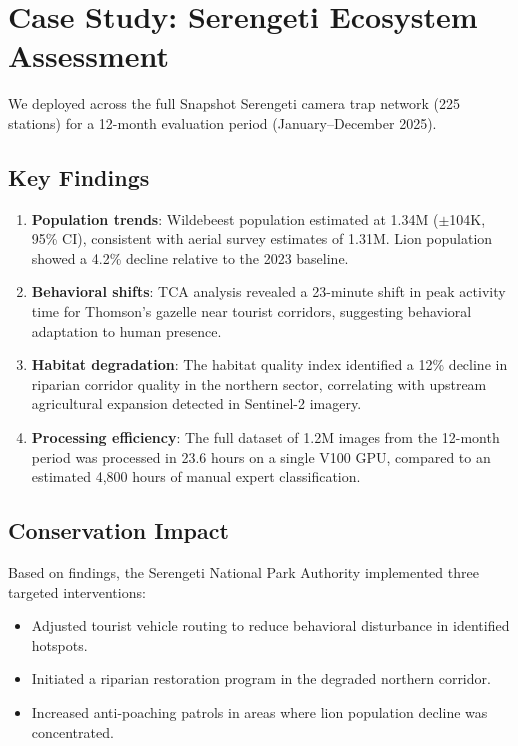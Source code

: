\section{Case Study: Serengeti Ecosystem Assessment}


We deployed \ConservAI{} across the full Snapshot Serengeti camera trap network (225 stations) for a 12-month evaluation period (January--December 2025).

\subsection{Key Findings}

\begin{enumerate}[leftmargin=*]
    \item \textbf{Population trends}: Wildebeest population estimated at 1.34M ($\pm$104K, 95\% CI), consistent with aerial survey estimates of 1.31M. Lion population showed a 4.2\% decline relative to the 2023 baseline.
    \item \textbf{Behavioral shifts}: TCA analysis revealed a 23-minute shift in peak activity time for Thomson's gazelle near tourist corridors, suggesting behavioral adaptation to human presence.
    \item \textbf{Habitat degradation}: The habitat quality index identified a 12\% decline in riparian corridor quality in the northern sector, correlating with upstream agricultural expansion detected in Sentinel-2 imagery.
    \item \textbf{Processing efficiency}: The full dataset of 1.2M images from the 12-month period was processed in 23.6 hours on a single V100 GPU, compared to an estimated 4,800 hours of manual expert classification.
\end{enumerate}

\subsection{Conservation Impact}

Based on \ConservAI{} findings, the Serengeti National Park Authority implemented three targeted interventions:

\begin{itemize}[leftmargin=*]
    \item Adjusted tourist vehicle routing to reduce behavioral disturbance in identified hotspots.
    \item Initiated a riparian restoration program in the degraded northern corridor.
    \item Increased anti-poaching patrols in areas where lion population decline was concentrated.
\end{itemize}

